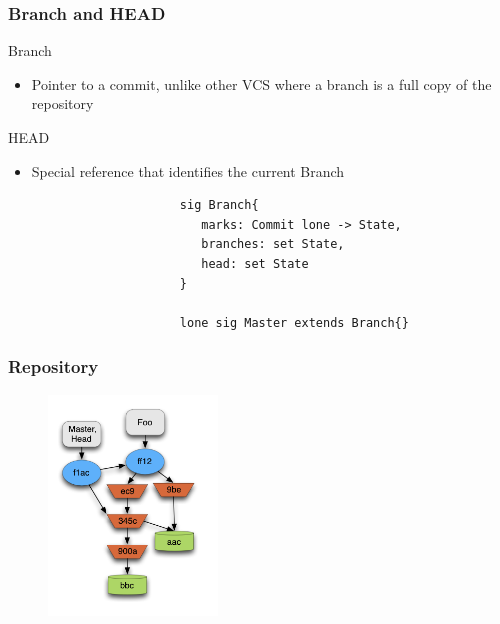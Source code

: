 \documentclass{beamer}
\begin{document}
\begin{frame}[fragile]
\frametitle{Branch and HEAD}
   \begin{block}{Branch}
      \begin{itemize}
         \item Pointer to a commit, unlike other VCS where a branch is a full
	 copy of the repository
      \end{itemize}
   \end{block}
   \begin{block}{HEAD}
      \begin{itemize} 
         \item Special reference that identifies the current Branch
      \end{itemize}
   \end{block}
   \tiny
   \color{blue}
   \begin{lstlisting}
                        sig Branch{
                           marks: Commit lone -> State,
                           branches: set State,
                           head: set State
                        }

                        lone sig Master extends Branch{}
   \end{lstlisting}
\end{frame}

\begin{frame}
	\frametitle{Repository}
	\begin{figure}
		\centering
		\includegraphics[width=0.4\textwidth]{images/object_assoc.png}
	\end{figure}
\end{frame}
\end{document}
